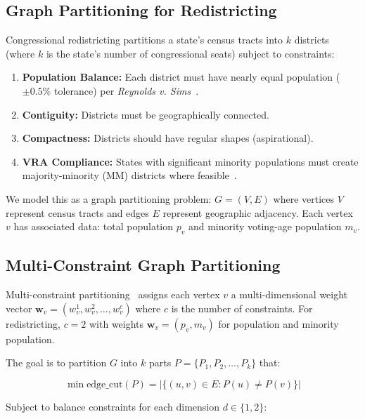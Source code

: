\label{sec:background}

\subsection{Graph Partitioning for Redistricting}

Congressional redistricting partitions a state's census tracts into $k$ districts (where $k$ is the state's number of congressional seats) subject to constraints:

\begin{enumerate}
    \item \textbf{Population Balance:} Each district must have nearly equal population ($\pm0.5\%$ tolerance) per \textit{Reynolds v. Sims}~\cite{reynolds1964}.
    \item \textbf{Contiguity:} Districts must be geographically connected.
    \item \textbf{Compactness:} Districts should have regular shapes (aspirational).
    \item \textbf{VRA Compliance:} States with significant minority populations must create majority-minority (MM) districts where feasible~\cite{thornburg1986}.
\end{enumerate}

We model this as a graph partitioning problem: $G = (V, E)$ where vertices $V$ represent census tracts and edges $E$ represent geographic adjacency. Each vertex $v$ has associated data: total population $p_v$ and minority voting-age population $m_v$.

\subsection{Multi-Constraint Graph Partitioning}

Multi-constraint partitioning~\cite{karypis1999multilevel} assigns each vertex $v$ a multi-dimensional weight vector $\mathbf{w}_v = (w_v^1, w_v^2, \ldots, w_v^c)$ where $c$ is the number of constraints. For redistricting, $c=2$ with weights $\mathbf{w}_v = (p_v, m_v)$ for population and minority population.

The goal is to partition $G$ into $k$ parts $P = \{P_1, P_2, \ldots, P_k\}$ that:

\begin{equation}
\min \text{edge\_cut}(P) = \left| \{(u,v) \in E : P(u) \neq P(v)\} \right|
\end{equation}

Subject to balance constraints for each dimension $d \in \{1, 2\}$:

